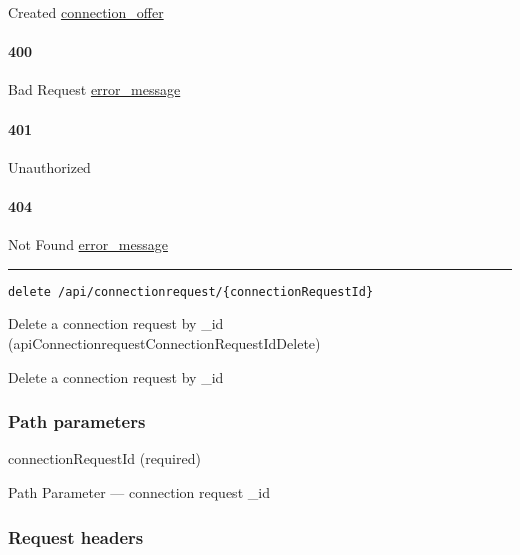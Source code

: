 Created \protect\hyperlink{connection_offer}{connection\_offer}

\hypertarget{section-73}{%
\paragraph{400}\label{section-73}}

Bad Request \protect\hyperlink{error_message}{error\_message}

\hypertarget{section-74}{%
\paragraph{401}\label{section-74}}

Unauthorized \protect\hyperlink{}{}

\hypertarget{section-75}{%
\paragraph{404}\label{section-75}}

Not Found \protect\hyperlink{error_message}{error\_message}

\begin{center}\rule{0.5\linewidth}{\linethickness}\end{center}

\protect\hypertarget{apiConnectionrequestConnectionRequestIdDelete}{}{}

\begin{verbatim}
delete /api/connectionrequest/{connectionRequestId}
\end{verbatim}

Delete a connection request by \_id
({apiConnectionrequestConnectionRequestIdDelete})

Delete a connection request by \_id

\hypertarget{path-parameters-14}{%
\subsubsection{Path parameters}\label{path-parameters-14}}

connectionRequestId (required)

{Path Parameter} --- connection request \_id

\hypertarget{request-headers-9}{%
\subsubsection{Request headers}\label{request-headers-9}}

